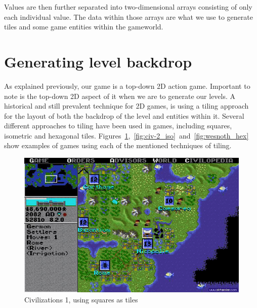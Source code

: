 Values are then further separated into two-dimensional arrays consisting of
only each individual value.  The data within those arrays are what we use to
generate tiles and some game entities within the gameworld.

\section{Generating level backdrop}
As explained previously, our game is a top-down 2D action game. Important to
note is the top-down 2D aspect of it when we are to generate our levels.
A historical and still prevalent technique for 2D games, is using a
tiling approach for the layout of both the backdrop of the level and entities
within it. Several different approaches to tiling have been used in games,
including squares, isometric and hexagonal tiles.
Figures~\ref{fig:civ-1_square},~\ref{fig:civ-2_iso}~and~\ref{fig:wesnoth_hex}
show examples of games using each of the mentioned techniques of
tiling.

\begin{figure}[H]
    \centering
    \includegraphics[width=1\textwidth]{figures/generating_levels/civ-1_square.png}
    \caption{Civilizations 1, using squares as tiles}\label{fig:civ-1_square} 
\end{figure}

